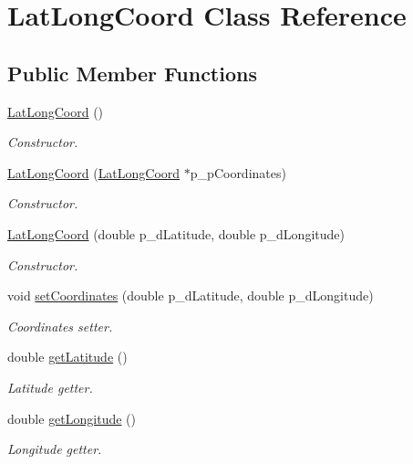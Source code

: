 \hypertarget{class_lat_long_coord}{\section{Lat\-Long\-Coord Class Reference}
\label{class_lat_long_coord}
}
\subsection*{Public Member Functions}
\begin{DoxyCompactItemize}
\item 
\hyperlink{class_lat_long_coord_a48eade76e022522bc889beb4ac4961ed}{Lat\-Long\-Coord} ()
\begin{DoxyCompactList}\small\item\em Constructor. \end{DoxyCompactList}\item 
\hyperlink{class_lat_long_coord_aee43e89f6f8886b88016c68354ae26ae}{Lat\-Long\-Coord} (\hyperlink{class_lat_long_coord}{Lat\-Long\-Coord} $\ast$p\-\_\-p\-Coordinates)
\begin{DoxyCompactList}\small\item\em Constructor. \end{DoxyCompactList}\item 
\hyperlink{class_lat_long_coord_a27c4d6b38d76698a18a447979e8fbf56}{Lat\-Long\-Coord} (double p\-\_\-d\-Latitude, double p\-\_\-d\-Longitude)
\begin{DoxyCompactList}\small\item\em Constructor. \end{DoxyCompactList}\item 
void \hyperlink{class_lat_long_coord_a9caab89d2a86b88bb02cd338aa1a504c}{set\-Coordinates} (double p\-\_\-d\-Latitude, double p\-\_\-d\-Longitude)
\begin{DoxyCompactList}\small\item\em Coordinates setter. \end{DoxyCompactList}\item 
double \hyperlink{class_lat_long_coord_afca20a958b9e90ffb0e0568cec0ed794}{get\-Latitude} ()
\begin{DoxyCompactList}\small\item\em Latitude getter. \end{DoxyCompactList}\item 
double \hyperlink{class_lat_long_coord_a9abfcd89b9a1d8b0c55052ea370ad435}{get\-Longitude} ()
\begin{DoxyCompactList}\small\item\em Longitude getter. \end{DoxyCompactList}\item 

\end{DoxyCompactItemize}
